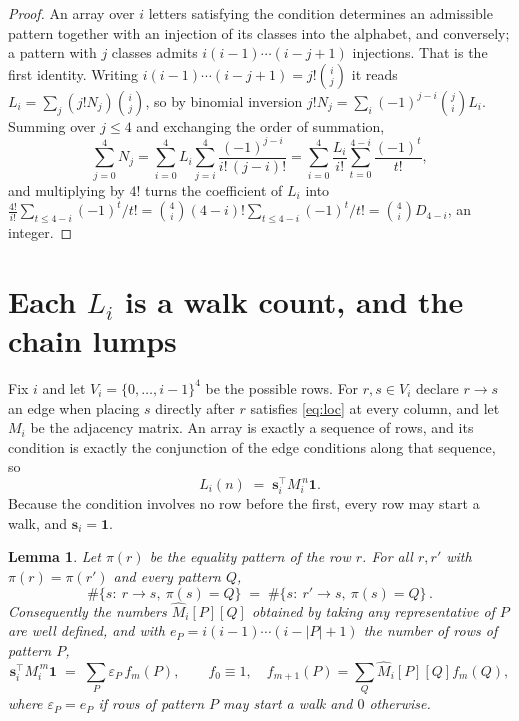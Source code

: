 \documentclass[11pt,a4paper]{article}
\theoremstyle{plain}
\newtheorem{lemma}[theorem]{Lemma}
\theoremstyle{definition}
\begin{document}
\begin{proof}
An array over $i$ letters satisfying the condition determines an admissible pattern together
with an injection of its classes into the alphabet, and conversely; a pattern with $j$
classes admits $i(i-1)\cdots(i-j+1)$ injections. That is the first identity. Writing
$i(i-1)\cdots(i-j+1)=j!\binom{i}{j}$ it reads $L_i=\sum_j (j!N_j)\binom{i}{j}$, so by
binomial inversion $j!N_j=\sum_{i}(-1)^{j-i}\binom{j}{i}L_i$. Summing over
$j\le 4$ and exchanging the order of summation,
\[
\sum_{j=0}^{4}N_j=\sum_{i=0}^{4}L_i\sum_{j=i}^{4}\frac{(-1)^{j-i}}{i!\,(j-i)!}
=\sum_{i=0}^{4}\frac{L_i}{i!}\sum_{t=0}^{4-i}\frac{(-1)^t}{t!} ,
\]
and multiplying by $4!$ turns the coefficient of $L_i$ into
$\frac{4!}{i!}\sum_{t\le 4-i}(-1)^t/t!=\binom{4}{i}(4-i)!\sum_{t\le 4-i}(-1)^t/t!
=\binom{4}{i}D_{4-i}$, an integer.
\end{proof}

\section{Each $L_i$ is a walk count, and the chain lumps}

Fix $i$ and let $V_i=\{0,\dots,i-1\}^{4}$ be the possible rows. For $r,s\in V_i$
declare $r\to s$ an edge when placing $s$ directly after $r$ satisfies \eqref{eq:loc} at
every column, and let $M_i$ be the adjacency matrix. An array is exactly a sequence of
rows, and its condition is exactly the conjunction of the edge conditions along that
sequence, so
\[
L_i(n)\;=\;\mathbf{s}_i^{\!\top}M_i^{\,n}\mathbf{1} .
\]
Because the condition involves no row before the first, every
row may start a walk, and $\mathbf{s}_i=\mathbf{1}$.

\begin{lemma}\label{lem:lump}
Let $\pi(r)$ be the equality pattern of the row $r$. For all $r,r'$ with
$\pi(r)=\pi(r')$ and every pattern $Q$,
\[
\#\{s:\ r\to s,\ \pi(s)=Q\}\;=\;\#\{s:\ r'\to s,\ \pi(s)=Q\}\, .
\]
Consequently the numbers $\widehat M_i[P][Q]$ obtained by taking any representative of $P$
are well defined, and with $e_P=i(i-1)\cdots(i-|P|+1)$ the number of rows of pattern $P$,
\[
\mathbf{s}_i^{\!\top}M_i^{\,m}\mathbf{1}\;=\;\sum_P \varepsilon_P\,f_m(P),
\qquad f_0\equiv1,\quad f_{m+1}(P)=\sum_Q\widehat M_i[P][Q]f_m(Q),
\]
where $\varepsilon_P=e_P$ if rows of pattern $P$ may start a walk and $0$ otherwise.
\end{lemma}
\end{document}
